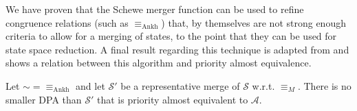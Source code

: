 \vspace{5pt}

We have proven that the Schewe merger function can be used to refine congruence relations (such as $\equiv_\text{Ankh}$) that, by themselves are not strong enough criteria to allow for a merging of states, to the point that they can be used for state space reduction. A final result regarding this technique is adapted from \cite{Schewe2010} and shows a relation between this algorithm and priority almost equivalence.



\begin{lem}
	Let $\sim = \equiv_\text{Ankh}$ and let $\mathcal{S}'$ be a representative merge of $\mathcal{S}$ w.r.t. $\equiv_M$. There is no smaller DPA than $\mathcal{S}'$ that is priority almost equivalent to $\mathcal{A}$.
\end{lem} %

